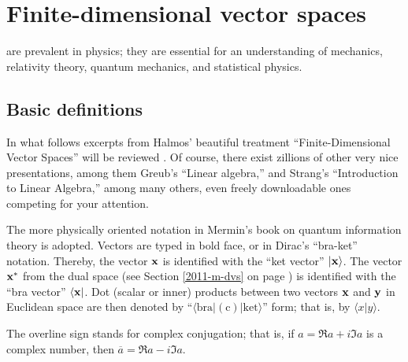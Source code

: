\chapter{Finite-dimensional vector spaces}
\label{ch:lvs}

 are prevalent in physics;
they are essential for an understanding
of mechanics, relativity theory, quantum mechanics, and statistical physics.


\section{Basic definitions}

In what follows excerpts from Halmos' beautiful treatment
``Finite-Dimensional Vector Spaces'' will be reviewed \cite{halmos-vs}.
Of course, there exist zillions of other very nice presentations, among them
Greub's ``Linear algebra,'' and
Strang's ``Introduction to Linear Algebra,''
among many others, even freely downloadable  ones
\cite{Greub75,Strang:2009:ILA,Homes-rorres,lipschutz:schaul-la,Hefferon}
competing for your attention.


The more physically oriented notation in Mermin's book on
quantum information theory \cite{mermin-04,mermin-07} is adopted.
Vectors are typed in bold face, or in Dirac's ``bra-ket'' notation.
Thereby,
the vector ${\bf x}$ is identified with the ``ket vector'' $\vert {\bf x}\rangle$.
The vector ${\bf x}^\ast$  from the dual space (see Section \ref{2011-m-dvs} on page \pageref{2011-m-dvs})
 is identified with the ``bra vector'' $\langle {\bf x}\vert$.
Dot (scalar or inner) products between two vectors ${\bf x}$ and ${\bf y}$   in Euclidean space are then
denoted by ``$\langle \textrm{bra} \vert  (\textrm{c}) \vert \textrm{ket}  \rangle$''  form;
that is, by $\langle x \vert  y  \rangle$.

The overline sign stands for complex conjugation; that is,
if
${a}= \Re a +i\Im a $ is a complex number, then
$\overline{a}= \Re a -i\Im a$.

